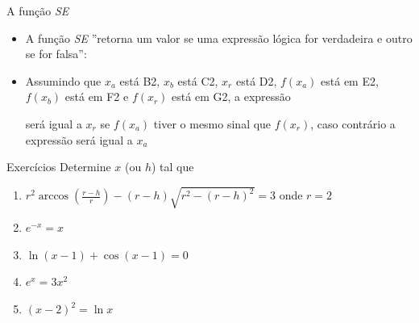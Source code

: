 \begin{frame}{A função \textit{SE}}
    \begin{itemize}
        \item A função \textit{SE} ''retorna um valor se uma expressão lógica for verdadeira e outro se for falsa'':
            \begin{center}
                \vspace{1em}
            \end{center}
        \item Assumindo que \(x_a\) está B2, \(x_b\) está C2, \(x_r\) está D2, \(f(x_a)\) está em E2, \(f(x_b)\) está em F2 e \(f(x_r)\) está em G2, a expressão
            \begin{center}
                \vspace{1em}
            \end{center}
            será igual a \(x_r\) se \(f(x_a)\) tiver o mesmo sinal que \(f(x_r)\), caso contrário a expressão será igual a \(x_a\)
    \end{itemize}
\end{frame}

\begin{frame}[label=chant]{Exercícios}
    Determine \(x\) (ou \(h\)) tal que
    \begin{enumerate}
        \item<1> \(r^2 \arccos{\left(\frac{r-h}{r}\right)}-(r-h)\sqrt{r^2-(r-h)^2}=3\) onde \(r=2\)
        \item \(e^{-x}=x\)
        \item \(\ln(x-1) + \cos(x-1)=0 \)
        \item \(e^x=3x^2\)
        \item \((x-2)^2=\ln x\)
    \end{enumerate}
\end{frame}


